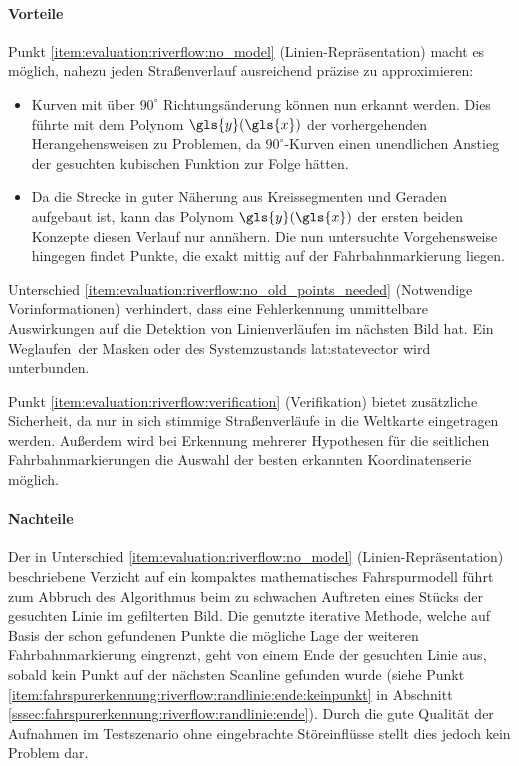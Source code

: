 \paragraph{Vorteile}
Punkt \ref{item:evaluation:riverflow:no_model} (Linien-Repräsentation) macht es möglich, nahezu jeden Straßenverlauf ausreichend präzise zu approximieren:
\begin{itemize} 
\item
Kurven mit über \(90^{\circ}\) Richtungsänderung können nun erkannt werden. Dies führte mit dem Polynom \(\gls{y}(\gls{x})\) der vorhergehenden Herangehensweisen zu Problemen, da \(90^{\circ}\)-Kurven einen unendlichen Anstieg der gesuchten kubischen Funktion zur Folge hätten.
\item
Da die Strecke in guter Näherung aus Kreissegmenten und Geraden aufgebaut ist, kann das  Polynom \(\gls{y}(\gls{x})\) der ersten beiden Konzepte diesen Verlauf nur annähern. Die nun untersuchte Vorgehensweise hingegen findet Punkte, die exakt mittig auf der Fahrbahnmarkierung liegen.
\end{itemize}
Unterschied \ref{item:evaluation:riverflow:no_old_points_needed} (Notwendige Vorinformationen) verhindert, dass eine Fehlerkennung unmittelbare Auswirkungen auf die Detektion von Linienverläufen im nächsten Bild hat. Ein \glqq Weglaufen\grqq\ der Masken oder des Systemzustands \gls{lat:statevector} wird unterbunden.

Punkt \ref{item:evaluation:riverflow:verification} (Verifikation) bietet zusätzliche Sicherheit, da nur in sich stimmige Straßenverläufe in die Weltkarte eingetragen werden. Außerdem wird bei Erkennung mehrerer Hypothesen für die seitlichen Fahrbahnmarkierungen die Auswahl der besten erkannten Koordinatenserie möglich.

\paragraph{Nachteile}
Der in Unterschied \ref{item:evaluation:riverflow:no_model} (Linien-Repräsentation) beschriebene Verzicht auf ein kompaktes mathematisches Fahrspurmodell führt zum Abbruch des Algorithmus beim zu schwachen Auftreten eines Stücks der gesuchten Linie im gefilterten Bild. Die genutzte iterative Methode, welche auf Basis der schon gefundenen Punkte die mögliche Lage der weiteren Fahrbahnmarkierung eingrenzt, geht von einem Ende der gesuchten Linie aus, sobald kein Punkt auf der nächsten Scanline gefunden wurde (siehe Punkt \ref{item:fahrspurerkennung:riverflow:randlinie:ende:keinpunkt} in Abschnitt \ref{sssec:fahrspurerkennung:riverflow:randlinie:ende}). Durch die gute Qualität der Aufnahmen im Testszenario ohne eingebrachte Störeinflüsse stellt dies jedoch kein  Problem dar.

